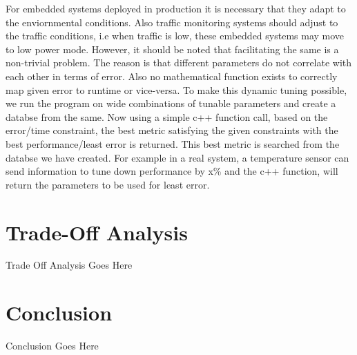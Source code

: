 \documentclass[conference]{IEEEtran}
\begin{document}
For embedded systems deployed in production it is necessary that they adapt to the enviornmental conditions. Also traffic monitoring systems should adjust to the traffic conditions,
i.e when traffic is low, these embedded systems may move to low power mode. 
However, it should be noted that facilitating the same is a non-trivial problem. The reason is that different parameters do not correlate with each other in terms of error. Also no mathematical function exists to correctly map given error to runtime or vice-versa.
To make this dynamic tuning possible, we run the program on wide combinations of tunable parameters and create a databse from the same.
Now using a simple c++ function call, based on the error/time constraint, the best metric satisfying the given constraints with the best performance/least error is returned. This best metric is searched from the databse we have created. For example in a real system, a temperature sensor can send information to tune down performance by x\% and 
the c++ function, will return the parameters to be used for least error.

\section{Trade-Off Analysis}

Trade Off Analysis Goes Here

\section{Conclusion}

Conclusion Goes Here



\end{document}
